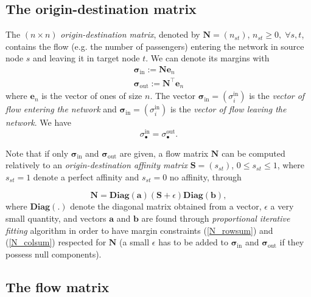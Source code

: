 \documentclass[11p]{article}
\begin{document}
\subsection{The origin-destination matrix}

The $(n \times n)$ \emph{origin-destination matrix}, denoted by $\mathbf{N} = (n_{st})$, $n_{st} \geq 0, \; \forall s,t$, contains the flow (e.g. the number of passengers) entering the network in source node $s$ and leaving it in target node $t$. We can denote its margins with 
\begin{align}
\bm{\sigma}_\text{in} := \mathbf{N} \mathbf{e}_n \label{N_rowsum}\\
\bm{\sigma}_\text{out} := \mathbf{N}^\top \mathbf{e}_n \label{N_colsum}
\end{align}
where $\mathbf{e}_n$ is the vector of ones of size $n$. The vector $\bm{\sigma}_\text{in} = (\sigma^\text{in}_i)$ is the \emph{vector of flow entering the network} and $\bm{\sigma}_\text{in} = (\sigma^\text{in}_i)$ is the \emph{vector of flow leaving the network}. We have
\begin{equation}
\sigma^\text{in}_{\bullet} = \sigma^\text{out}_{\bullet}.
\end{equation}

Note that if only $\bm{\sigma}_\text{in}$ and $\bm{\sigma}_\text{out}$ are given, a flow matrix $\mathbf{N}$ can be computed relatively to an \emph{origin-destination affinity matrix} $\mathbf{S} = (s_{st})$, $0 \leq s_{st} \leq 1$, where $s_{st} = 1$ denote a perfect affinity and $s_{st} = 0$ no affinity, through

\begin{equation}
\mathbf{N} = \textbf{Diag}(\mathbf{a}) (\mathbf{S} + \epsilon) \textbf{Diag}(\mathbf{b}),
\end{equation}
where $\textbf{Diag}(.)$ denote the diagonal matrix obtained from a vector, $\epsilon$ a very small quantity, and vectors $\mathbf{a}$ and $\mathbf{b}$ are found through \emph{proportional iterative fitting} algorithm in order to have margin constraints (\ref{N_rowsum}) and (\ref{N_colsum}) respected for $\mathbf{N}$ (a small $\epsilon$ has to be added to $\bm{\sigma}_\text{in}$ and $\bm{\sigma}_\text{out}$ if they possess null components).


\subsection{The flow matrix}
\end{document}
